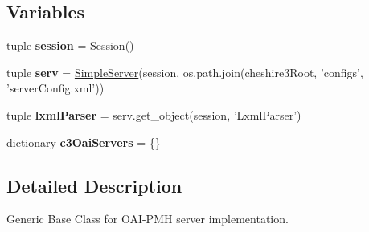 \subsection*{Variables}
\begin{DoxyCompactItemize}
\item 
\hypertarget{namespacecheshire3_1_1web_1_1oaipmh_handler_a39cf6bc1858043e1388488449d3e14fa}{tuple {\bfseries session} = Session()}\label{namespacecheshire3_1_1web_1_1oaipmh_handler_a39cf6bc1858043e1388488449d3e14fa}

\item 
\hypertarget{namespacecheshire3_1_1web_1_1oaipmh_handler_aa0ea2ac3833f85faea60b01bacc8e53c}{tuple {\bfseries serv} = \hyperlink{classcheshire3_1_1server_1_1_simple_server}{Simple\-Server}(session, os.\-path.\-join(cheshire3\-Root, 'configs', 'server\-Config.\-xml'))}\label{namespacecheshire3_1_1web_1_1oaipmh_handler_aa0ea2ac3833f85faea60b01bacc8e53c}

\item 
\hypertarget{namespacecheshire3_1_1web_1_1oaipmh_handler_a522594dcac85754a0b6882d3c2b75c21}{tuple {\bfseries lxml\-Parser} = serv.\-get\-\_\-object(session, 'Lxml\-Parser')}\label{namespacecheshire3_1_1web_1_1oaipmh_handler_a522594dcac85754a0b6882d3c2b75c21}

\item 
\hypertarget{namespacecheshire3_1_1web_1_1oaipmh_handler_a890337834e44e98c5b36b76cfcedd619}{dictionary {\bfseries c3\-Oai\-Servers} = \{\}}\label{namespacecheshire3_1_1web_1_1oaipmh_handler_a890337834e44e98c5b36b76cfcedd619}

\end{DoxyCompactItemize}


\subsection{Detailed Description}
\begin{DoxyVerb}Generic Base Class for OAI-PMH server implementation.\end{DoxyVerb}
 

